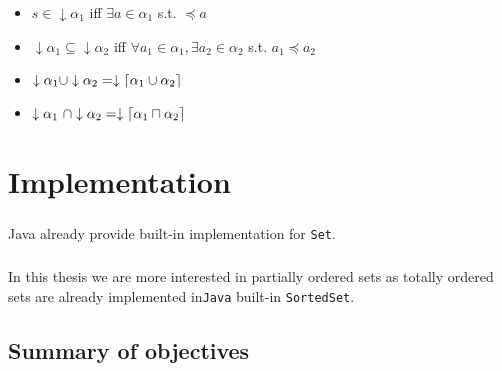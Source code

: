 \documentclass[letterpaper]{memoir}
\DeclarePairedDelimiter{\ceil}{\lceil}{\rceil}
\begin{document}
\begin{itemize}
    \item $s \in \downarrow \alpha_1$
    iff $\exists a \in \alpha_1$ s.t. $\preceq a$
    \item $\downarrow \alpha_1 \subseteq \downarrow \alpha_2$
    iff $\forall a_1 \in \alpha_1,
    \exists a_2 \in \alpha_2$ s.t. $a_1 \preceq a_2$
    \item $ \downarrow \alpha_1 \cup \downarrow \alpha_2 =
    \downarrow \ceil{\alpha_1 \cup \alpha_2}$
    \item $\downarrow \alpha_1 \ \cap \downarrow \alpha_2 =
    \downarrow \ceil{\alpha_1 \sqcap \alpha_2}$
\end{itemize}

%
%

\chapter{Implementation}

\paragraph{}

Java already provide built-in implementation for \texttt{Set}.

\paragraph{}

In this thesis we are more interested in partially ordered sets as
totally ordered sets are already implemented
in\texttt{Java} built-in
\texttt{SortedSet}.

\section{Summary of objectives}
\end{document}
